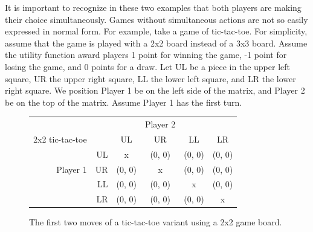 It is important to recognize in these two examples that both players are making their choice simultaneously. Games without simultaneous actions are not so easily expressed in normal form. For example, take a game of tic-tac-toe. For simplicity, assume that the game is played with a 2x2 board instead of a 3x3 board. Assume the utility function award players 1 point for winning the game, -1 point for losing the game, and 0 points for a draw. Let UL be a piece in the upper left square, UR the upper right square, LL the lower left square, and LR the lower right square. We position Player 1 be on the left side of the matrix, and Player 2 be on the top of the matrix. Assume Player 1 has the first turn.\\
\begin{figure}[H]
  \centering
  \begin{tabular}{r r | c | c | c | c |}
    &\multicolumn{1}{c}{}&\multicolumn{1}{c}{}&\multicolumn{1}{c}{Player 2}&\multicolumn{1}{c}{}\\
    \multicolumn{1}{c}{2x2 tic-tac-toe}&\multicolumn{1}{c}{}&\multicolumn{1}{c}{UL}&
    \multicolumn{1}{c}{UR}&\multicolumn{1}{c}{LL}&\multicolumn{1}{c}{LR}\\ \cline{3-6}
    & UL & x & (0, 0) & (0, 0) & (0, 0) \\ \cline{3-6}
    Player 1 & UR & (0, 0) & x & (0, 0) & (0, 0) \\ \cline{3-6}
    & LL & (0, 0) & (0, 0) & x & (0, 0) \\ \cline{3-6}
    & LR & (0, 0) & (0, 0) & (0, 0) & x \\ \cline{3-6}
  \end{tabular}
  \caption{The first two moves of a tic-tac-toe variant using a 2x2 game board.}
  \label{fig:2x2TTT}
\end{figure}

